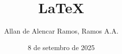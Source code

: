 \documentclass[12pt, a4paper]{article}
\begin{document}
\title{LaTeX}
\author{Allan de Alencar Ramos, Ramos A.A.}
\date{8 de setembro de 2025}
\maketitle
\end{document}
